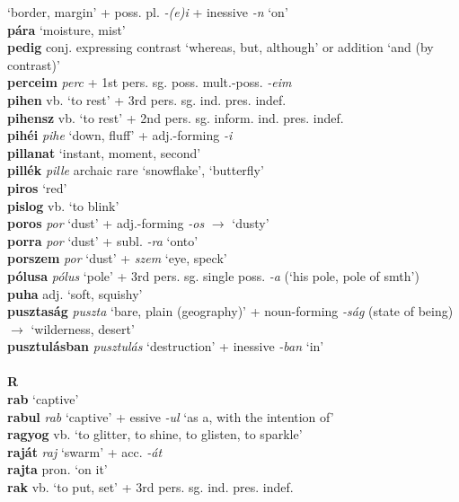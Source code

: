 \documentclass[11pt]{article}
\begin{document}
`border, margin' + poss. pl. \emph{-(e)i} + inessive \emph{-n} `on' \\
\textbf{pára} `moisture, mist' \\
\textbf{pedig} conj. expressing contrast `whereas, but, although' or
addition `and (by contrast)' \\
\textbf{perceim} \emph{perc} + 1st
pers. sg. poss. mult.\hyp{}poss. \emph{-eim} \\
\textbf{pihen} vb. `to rest' + 3rd pers. sg. ind. pres. indef. \\
\textbf{pihensz} vb. `to rest' + 2nd
pers. sg. inform. ind. pres. indef. \\
\textbf{pihéi} \emph{pihe} `down, fluff' + adj.\hyp{}forming \emph{-i} \\
\textbf{pillanat} `instant, moment, second' \\
\textbf{pillék} \emph{pille} archaic rare `snowflake', `butterfly' \\
\textbf{piros} `red' \\
\textbf{pislog} vb. `to blink' \\
\textbf{poros} \emph{por} `dust' + adj.\hyp{}forming \emph{-os}
$\rightarrow$ `dusty' \\
\textbf{porra} \emph{por} `dust' + subl. \emph{-ra} `onto' \\
\textbf{porszem} \emph{por} `dust' + \emph{szem} `eye, speck' \\
\textbf{pólusa} \emph{pólus} `pole' + 3rd pers. sg. single
poss. \emph{-a} (`his pole, pole of smth') \\
\textbf{puha} adj. `soft, squishy' \\
\textbf{pusztaság} \emph{puszta} `bare, plain (geography)' +
noun\hyp{}forming \emph{-ság} (state of being) $\rightarrow$
`wilderness, desert' \\
\textbf{pusztulásban} \emph{pusztulás} `destruction' +
inessive \emph{-ban} `in' \\
\ \\
\noindent \textbf{\large R} \\
\textbf{rab} `captive' \\
\textbf{rabul} \emph{rab} `captive' + essive
  \emph{-ul} `as a, with the intention of' \\
\textbf{ragyog} vb. `to glitter, to shine, to glisten, to sparkle' \\
\textbf{raját} \emph{raj} `swarm' + acc. \emph{-át} \\
\textbf{rajta} pron. `on it' \\
\textbf{rak} vb. `to put, set' + 3rd pers. sg. ind. pres. indef.\\
\end{document}
